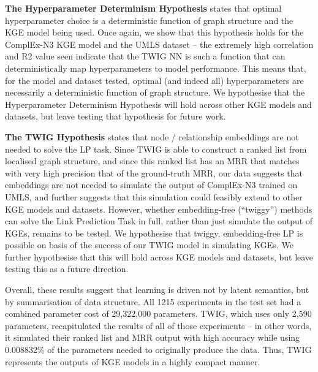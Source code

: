 \textbf{The Hyperparameter Determinism Hypothesis} states that optimal hyperparameter choice is a deterministic function of graph structure and the KGE model being used. Once again, we show that this hypothesis holds for the ComplEx-N3 KGE model and the UMLS dataset -- the extremely high correlation and R2 value seen indicate that the TWIG NN is such a function that can deterministically map hyperparameters to model performance. This means that, for the model and dataset tested, optimal (and indeed all) hyperparameters are necessarily a deterministic function of graph structure. We hypothesise that the Hyperparameter Determinism Hypothesis will hold across other KGE models and datasets, but leave testing that hypothesis for future work.

\textbf{The TWIG Hypothesis} states that node / relationship embeddings are not needed to solve the LP task. Since TWIG is able to construct a ranked list from localised graph structure, and since this ranked list has an MRR that matches with very high precision that of the ground-truth MRR, our data suggests that embeddings are not needed to simulate the output of ComplEx-N3 trained on UMLS, and further suggests that this simulation could feasibly extend to other KGE models and datasets. However, whether embedding-free (``twiggy'') methods can solve the Link Prediction Task in full, rather than just simulate the output of KGEs, remains to be tested. We hypothesise that twiggy, embedding-free LP is possible on basis of the success of our TWIG model in simulating KGEs. We further hypothesise that this will hold across KGE models and datasets, but leave testing this as a future direction. 

Overall, these results suggest that learning is driven not by latent semantics, but by summarisation of data structure. All 1215 experiments in the test set had a combined parameter cost of 29,322,000 parameters. TWIG, which uses only 2,590 parameters, recapitulated the results of all of those experiments -- in other words, it simulated their ranked list and MRR output with high accuracy while using 0.008832\% of the parameters needed to originally produce the data. Thus, TWIG represents the outputs of KGE models in a highly compact manner.

